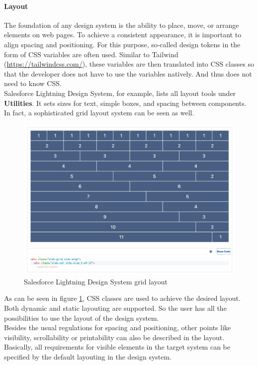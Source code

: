 \paragraph{Layout}
The foundation of any design system is the ability to place, move, or arrange elements on web pages. To achieve a consistent appearance, it is important to align spacing and positioning. 
For this purpose, so-called design tokens in the form of CSS variables are often used. Similar to Tailwind (\url{https://tailwindcss.com/}), these variables are then translated into CSS classes so that the developer does not have to use the variables natively. And thus does not need to know CSS.  \\
Salesforce Lightning Design System, for example, lists all layout tools under \textbf{Utilities}. It sets sizes for text, simple boxes, and spacing between components. In fact, a sophisticated grid layout system can be seen as well. \\

\begin{figure}[hbtp]
	\centerline{\includegraphics[width=\linewidth]{images/salesforce_lightning_layout.png}}
	\caption{Salesforce Lightning Design System grid layout \cite{lightning_design_system_lightning_nodate}}
	\label{salesforce_lightning_layout}
\end{figure}

As can be seen in figure \ref{salesforce_lightning_layout}, CSS classes are used to achieve the desired layout. Both dynamic and static layouting are supported. So the user has all the possibilities to use the layout of the design system. \\
Besides the usual regulations for spacing and positioning, other points like visibility, scrollability or printability can also be described in the layout. Basically, all requirements for visible elements in the target system can be specified by the default layouting in the design system.

